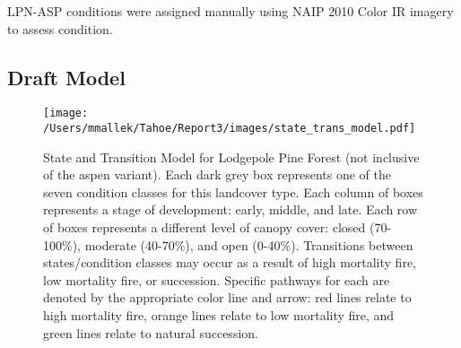 LPN-ASP conditions were assigned manually using NAIP 2010 Color IR imagery to assess condition.

\subsection*{Draft Model}
\begin{figure}[htbp]
\centering
\texttt{[image: /Users/mmallek/Tahoe/Report3/images/state\_trans\_model.pdf]}
\caption{State and Transition Model for Lodgepole Pine Forest (not inclusive of the aspen variant). Each dark grey box represents one of the seven condition classes for this landcover type. Each column of boxes represents a stage of development: early, middle, and late. Each row of boxes represents a different level of canopy cover: closed (70-100\%), moderate (40-70\%), and open (0-40\%). Transitions between states/condition classes may occur as a result of high mortality fire, low mortality fire, or succession. Specific pathways for each are denoted by the appropriate color line and arrow: red lines relate to high mortality fire, orange lines relate to low mortality fire, and green lines relate to natural succession.} 
\label{transmodel_lpn}
\end{figure}

\clearpage
